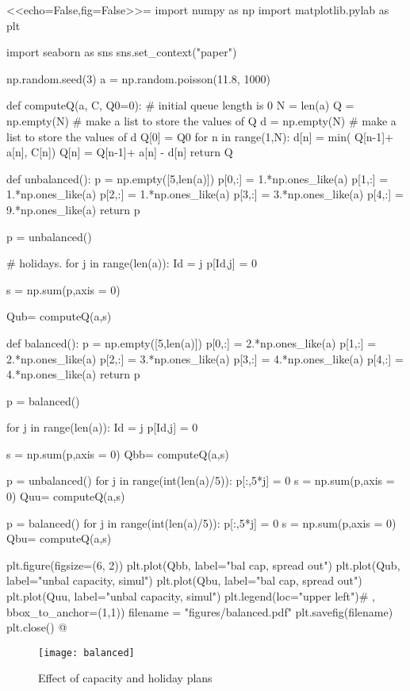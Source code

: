 <<echo=False,fig=False>>=
import numpy as np
import matplotlib.pylab as plt


import seaborn as sns
sns.set_context("paper")

np.random.seed(3)
a = np.random.poisson(11.8, 1000)

def computeQ(a, C, Q0=0): #  initial queue length is 0
    N = len(a)
    Q = np.empty(N) # make a list to store the values of  Q
    d = np.empty(N) # make a list to store the values of  d
    Q[0] = Q0
    for n in range(1,N):
        d[n] = min( Q[n-1]+ a[n], C[n])
        Q[n] = Q[n-1]+ a[n] - d[n]
    return Q

def unbalanced():
    p = np.empty([5,len(a)])
    p[0,:] = 1.*np.ones_like(a)
    p[1,:] = 1.*np.ones_like(a)
    p[2,:] = 1.*np.ones_like(a)
    p[3,:] = 3.*np.ones_like(a)
    p[4,:] = 9.*np.ones_like(a)
    return p

p = unbalanced()

# holidays.
for j in range(len(a)):
    Id = j%
    p[Id,j] = 0

s = np.sum(p,axis = 0)

Qub= computeQ(a,s)

def balanced():
    p = np.empty([5,len(a)])
    p[0,:] = 2.*np.ones_like(a)
    p[1,:] = 2.*np.ones_like(a)
    p[2,:] = 3.*np.ones_like(a)
    p[3,:] = 4.*np.ones_like(a)
    p[4,:] = 4.*np.ones_like(a)
    return p

p = balanced()

for j in range(len(a)):
    Id = j%
    p[Id,j] = 0

s = np.sum(p,axis = 0)
Qbb= computeQ(a,s)

p = unbalanced()
for j in range(int(len(a)/5)):
     p[:,5*j] = 0
s = np.sum(p,axis = 0)
Quu= computeQ(a,s)

p = balanced()
for j in range(int(len(a)/5)):
     p[:,5*j] = 0
s = np.sum(p,axis = 0)
Qbu= computeQ(a,s)

plt.figure(figsize=(6, 2))
plt.plot(Qbb, label="bal cap, spread out")
plt.plot(Qub, label="unbal capacity, simul")
plt.plot(Qbu, label="bal cap, spread out")
plt.plot(Quu, label="unbal capacity, simul")
plt.legend(loc="upper left")# , bbox_to_anchor=(1,1))
filename = "figures/balanced.pdf"
plt.savefig(filename)
plt.close()
@ 

\begin{figure}[ht]
  \centering
\texttt{[image: balanced]} 
  \caption{Effect of capacity and holiday plans}
\label{fig:balanced}
\end{figure}


